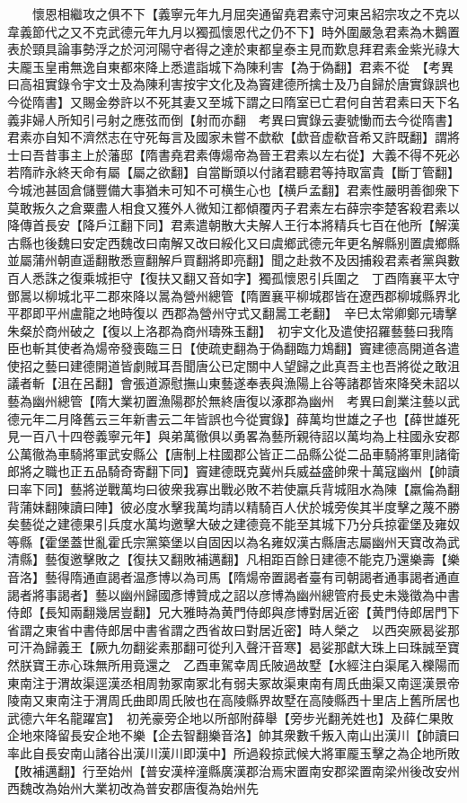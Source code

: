 　　懷恩相繼攻之俱不下【義寧元年九月屈突通留堯君素守河東呂紹宗攻之不克以韋義節代之又不克武德元年九月以獨孤懷恩代之仍不下】時外圍嚴急君素為木鵝置表於頸具論事勢浮之於河河陽守者得之達於東都皇泰主見而歎息拜君素金紫光祿大夫龎玉皇甫無逸自東都來降上悉遣詣城下為陳利害【為于偽翻】君素不從　【考異曰高祖實錄令宇文士及為陳利害按宇文化及為竇建德所擒士及乃自歸於唐實錄誤也今從隋書】又賜金劵許以不死其妻又至城下謂之曰隋室已亡君何自苦君素曰天下名義非婦人所知引弓射之應弦而倒【射而亦翻　考異曰實錄云妻號慟而去今從隋書】君素亦自知不濟然志在守死每言及國家未嘗不歔欷【歔音虚欷音希又許既翻】謂將士曰吾昔事主上於藩邸【隋書堯君素傳煬帝為晉王君素以左右從】大義不得不死必若隋祚永終天命有屬【屬之欲翻】自當斷頭以付諸君聽君等持取富貴【斷丁管翻】今城池甚固倉儲豐備大事猶未可知不可横生心也【横戶孟翻】君素性嚴明善御衆下莫敢叛久之倉粟盡人相食又獲外人微知江都傾覆丙子君素左右薛宗李楚客殺君素以降傳首長安【降戶江翻下同】君素遣朝散大夫解人王行本將精兵七百在他所【解漢古縣也後魏曰安定西魏改曰南解又改曰綏化又曰虞鄉武德元年更名解縣别置虞鄉縣並屬蒲州朝直遥翻散悉亶翻解戶買翻將即亮翻】聞之赴救不及因捕殺君素者黨與數百人悉誅之復乘城拒守【復扶又翻又音如字】獨孤懷恩引兵圍之　丁酉隋襄平太守鄧暠以柳城北平二郡來降以暠為營州總管【隋置襄平柳城郡皆在遼西郡柳城縣界北平郡即平州盧龍之地時復以西郡為營州守式又翻暠工老翻】　辛巳太常卿鄭元璹擊朱粲於商州破之【復以上洛郡為商州璹殊玉翻】　初宇文化及遣使招羅藝藝曰我隋臣也斬其使者為煬帝發喪臨三日【使疏吏翻為于偽翻臨力鴆翻】竇建德高開道各遣使招之藝曰建德開道皆劇賊耳吾聞唐公已定關中人望歸之此真吾主也吾將從之敢沮議者斬【沮在呂翻】會張道源慰撫山東藝遂奉表與漁陽上谷等諸郡皆來降癸未詔以藝為幽州總管【隋大業初置漁陽郡於無終唐復以涿郡為幽州　考異曰創業注藝以武德元年二月降舊云三年新書云二年皆誤也今從實錄】薛萬均世雄之子也【薛世雄死見一百八十四卷義寧元年】與弟萬徹俱以勇畧為藝所親待詔以萬均為上柱國永安郡公萬徹為車騎將軍武安縣公【唐制上柱國郡公皆正二品縣公從二品車騎將軍則諸衛郎將之職也正五品騎奇寄翻下同】竇建德既克冀州兵威益盛帥衆十萬寇幽州【帥讀曰率下同】藝將逆戰萬均曰彼衆我寡出戰必敗不若使羸兵背城阻水為陳【羸倫為翻背蒲妹翻陳讀曰陣】彼必度水擊我萬均請以精騎百人伏於城旁俟其半度擊之蔑不勝矣藝從之建德果引兵度水萬均邀擊大破之建德竟不能至其城下乃分兵掠霍堡及雍奴等縣【霍堡蓋世亂霍氏宗黨築堡以自固因以為名雍奴漢古縣唐志屬幽州天寶改為武清縣】藝復邀擊敗之【復扶又翻敗補邁翻】凡相距百餘日建德不能克乃還樂壽【樂音洛】藝得隋通直謁者温彥博以為司馬【隋煬帝置謁者臺有司朝謁者通事謁者通直謁者將事謁者】藝以幽州歸國彥博贊成之詔以彦博為幽州總管府長史未幾徵為中書侍郎【長知兩翻幾居豈翻】兄大雅時為黄門侍郎與彦博對居近密【黄門侍郎居門下省謂之東省中書侍郎居中書省謂之西省故曰對居近密】時人榮之　以西突厥曷娑那可汗為歸義王【厥九勿翻娑素那翻可從刋入聲汗音寒】曷娑那獻大珠上曰珠誠至寶然朕寶王赤心珠無所用竟還之　乙酉車駕幸周氏陂過故墅【水經注白渠尾入櫟陽而東南注于渭故渠逕漢丞相周勃冢南冢北有弱夫冢故渠東南有周氏曲渠又南逕漢景帝陵南又東南注于渭周氏曲即周氏陂也在高陵縣界故墅在高陵縣西十里店上舊所居也武德六年名龍躍宫】　初羌豪旁企地以所部附薛舉【旁步光翻羌姓也】及薛仁果敗企地來降留長安企地不樂【企去智翻樂音洛】帥其衆數千叛入南山出漢川【帥讀曰率此自長安南山諸谷出漢川漢川即漢中】所過殺掠武候大將軍龎玉擊之為企地所敗【敗補邁翻】行至始州【普安漢梓潼縣廣漢郡治焉宋置南安郡梁置南梁州後改安州西魏改為始州大業初改為普安郡唐復為始州先